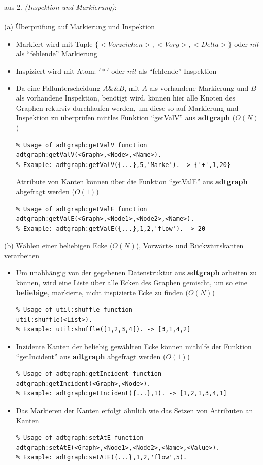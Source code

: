 \documentclass[11pt]{article}
\begin{document}
    aus 2. \textit{(Inspektion und Markierung)}: \\~\\
    (a) \"Uberpr\"ufung auf Markierung und Inspektion
    \begin{itemize}
        \item Markiert wird mit Tuple $\{<Vorzeichen>,<Vorg>,<Delta>\}$ oder $nil$ als "`fehlende"' Markierung
        \item Inspiziert wird mit Atom: $'*'$ oder $nil$ als "`fehlende"' Inspektion
        \item Da eine Fallunterscheidung $A \&\& B$, mit $A$ als vorhandene Markierung und $B$ als vorhandene Inspektion, ben\"otigt wird, k\"onnen hier alle Knoten des Graphen rekursiv durchlaufen werden, um diese so auf Markierung und Inspektion zu \"uberpr\"ufen mittles Funktion "`getValV"' aus \textbf{adtgraph} ($O(N)$)
\begin{lstlisting}
% Usage of adtgraph:getValV function
adtgraph:getValV(<Graph>,<Node>,<Name>).
% Example: adtgraph:getValV({...},5,'Marke'). -> {'+',1,20}
\end{lstlisting}
    Attribute von Kanten k\"onnen \"uber die Funktion "`getValE"' aus \textbf{adtgraph} abgefragt werden ($O(1)$)
\begin{lstlisting}
% Usage of adtgraph:getValE function
adtgraph:getValE(<Graph>,<Node1>,<Node2>,<Name>).
% Example: adtgraph:getValE({...},1,2,'flow'). -> 20
\end{lstlisting}
    \end{itemize}
    (b) W\"ahlen einer beliebigen Ecke ($O(N)$), Vorw\"arts- und R\"uckw\"artskanten verarbeiten
    \begin{itemize}
        \item Um unabh\"angig von der gegebenen Datenstruktur aus \textbf{adtgraph} arbeiten zu k\"onnen, wird eine Liste \"uber alle Ecken des Graphen gemischt, um so eine \textbf{beliebige}, markierte, nicht inspizierte Ecke zu finden ($O(N)$)
\begin{lstlisting}
% Usage of util:shuffle function
util:shuffle(<List>).
% Example: util:shuffle([1,2,3,4]). -> [3,1,4,2]
\end{lstlisting}
        \item Inzidente Kanten der beliebig gew\"ahlten Ecke k\"onnen mithilfe der Funktion\\ "`getIncident"' aus \textbf{adtgraph} abgefragt werden ($O(1)$)
\begin{lstlisting}
% Usage of adtgraph:getIncident function
adtgraph:getIncident(<Graph>,<Node>).
% Example: adtgraph:getIncident({...},1). -> [1,2,1,3,4,1]
\end{lstlisting}
        \item Das Markieren der Kanten erfolgt \"ahnlich wie das Setzen von Attributen an Kanten
\begin{lstlisting}
% Usage of adtgraph:setAtE function
adtgraph:setAtE(<Graph>,<Node1>,<Node2>,<Name>,<Value>).
% Example: adtgraph:setAtE({...},1,2,'flow',5).
\end{lstlisting}
    \end{itemize}
\end{document}
